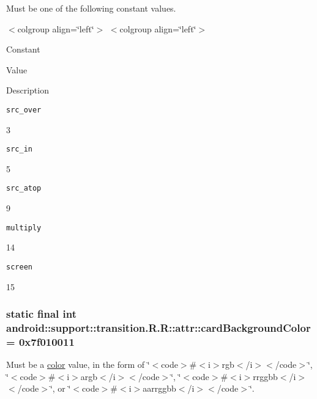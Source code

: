 Must be one of the following constant values. \begin{TabularC}{0}
\hline
\end{TabularC}
$<$colgroup align=\char`\"{}left\char`\"{}$>$ $<$colgroup align=\char`\"{}left\char`\"{}$>$ 

Constant

Value

Description 

{\tt src\_\-over}

3

{\tt src\_\-in}

5

{\tt src\_\-atop}

9

{\tt multiply}

14

{\tt screen}

15\hypertarget{classandroid_1_1support_1_1transition_1_1_r_1_1attr_b1477759c92e1b8208c09fb836facbbe}{
\subsubsection[{cardBackgroundColor}]{\setlength{\rightskip}{0pt plus 5cm}static final int android::support::transition.R.R::attr::cardBackgroundColor = 0x7f010011}}
\label{classandroid_1_1support_1_1transition_1_1_r_1_1attr_b1477759c92e1b8208c09fb836facbbe}


Must be a \hyperlink{classandroid_1_1support_1_1transition_1_1_r_1_1color}{color} value, in the form of \char`\"{}$<$code$>$\#$<$i$>$rgb$<$/i$>$$<$/code$>$\char`\"{}, \char`\"{}$<$code$>$\#$<$i$>$argb$<$/i$>$$<$/code$>$\char`\"{}, \char`\"{}$<$code$>$\#$<$i$>$rrggbb$<$/i$>$$<$/code$>$\char`\"{}, or \char`\"{}$<$code$>$\#$<$i$>$aarrggbb$<$/i$>$$<$/code$>$\char`\"{}. 

